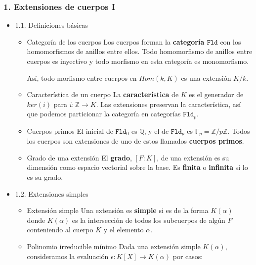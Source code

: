 \documentclass[11pt]{article}
\begin{document}
\subsubsection*{1. Extensiones de cuerpos I}
\label{sec-4-3-1}
\begin{itemize}
\item 1.1. Definiciones básicas
\label{sec-4-3-1-1}
\begin{itemize}
\item Categoría de los cuerpos
\label{sec-4-3-1-1-1}
Los cuerpos forman la \textbf{categoría $\mathtt{Fld}$} con los homomorfismos de 
anillos entre ellos. Todo homomorfismo de anillos entre cuerpos
es inyectivo y todo morfismo en esta categoría es monomorfismo.

Así, todo morfismo entre cuerpos en $Hom(k,K)$ es una extensión $K/k$.

\item Característica de un cuerpo
\label{sec-4-3-1-1-2}
La \textbf{característica} de $K$ es el generador de $ker(i)$ para 
$i : \mathbb{Z} \longrightarrow K$. Las extensiones preservan la 
característica, así que podemos particionar la categoría en categorías 
$\mathtt{Fld}_p$.

\item Cuerpos primos
\label{sec-4-3-1-1-3}
El inicial de $\mathtt{Fld}_0$ es $\mathbb{Q}$, y el de $\mathtt{Fld}_p$ es $\mathbb{F}_p = \mathbb{Z}/p\mathbb{Z}$. Todos los
cuerpos son extensiones de uno de estos llamados \textbf{cuerpos primos}.

\item Grado de una extensión
\label{sec-4-3-1-1-4}
El \textbf{grado}, $[F : K]$, de una extensión es su dimensión como espacio
vectorial sobre la base. Es \textbf{finita} o \textbf{infinita} si lo es su grado.
\end{itemize}

\item 1.2. Extensiones simples
\label{sec-4-3-1-2}
\begin{itemize}
\item Extensión simple
\label{sec-4-3-1-2-1}
Una extensión es \textbf{simple} si es de la forma $K(\alpha)$ donde 
$K(\alpha)$ es la intersección de todos los subcuerpos de algún
$F$ conteniendo al cuerpo $K$ y el elemento $\alpha$.

\item Polinomio irreducible mínimo
\label{sec-4-3-1-2-2}
Dada una extensión simple $K(\alpha)$, consideramos la evaluación
$\epsilon : K[X] \longrightarrow K(\alpha)$ por casos:


\end{itemize}
\end{itemize}
\end{document}
